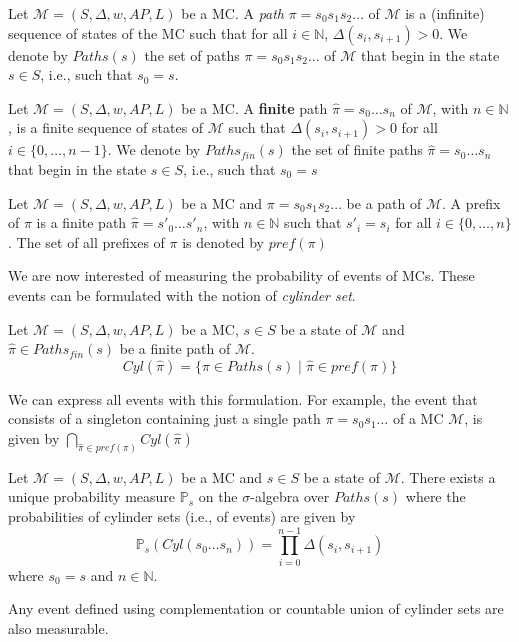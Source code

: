 \begin{definition} Let $\mathcal{M} = (S, \Delta, w, AP, L)$ be a MC.
A \textit{path} $\pi = s_0 s_1 s_2 \dots$ of $\mathcal{M}$ is a (infinite) sequence of states of the MC such that for all $i \in \mathbb{N}$, $\Delta(s_i, s_{i+1})> 0$. We denote by $Paths(s)$ the set of paths $\pi = s_0s_1s_2\dots$ of $\mathcal{M}$ that begin in the state $s \in S$, i.e., such that $s_0 = s$.
\end{definition}
\begin{definition}
Let $\mathcal{M} = (S, \Delta, w, AP, L)$ be a MC.
A \textbf{finite} path $\hat{\pi} = s_0 \dots s_n$ of $\mathcal{M}$, with $n \in \mathbb{N}$, is a finite sequence of states of $\mathcal{M}$ such that $\Delta(s_i, s_{i+1}) > 0$ for all $i \in \{0, \dots, n-1\}$.
We denote by $Paths_{fin}(s)$ the set of finite paths $\hat{\pi} = s_0 \dots s_n$ that begin in the state $s \in S$, i.e., such that $s_0 = s$
\end{definition}
\begin{definition}
Let $\mathcal{M} = (S, \Delta, w, AP, L)$ be a MC and $\pi = s_0s_1s_2 \dots$ be a path of $\mathcal{M}$. A prefix of $\pi$ is a finite path $\hat{\pi} = s'_0 \dots s'_n$, with $n \in \mathbb{N}$ such that $s'_i = s_i$ for all $i \in \{0, \dots, n\}$. The set of all prefixes of $\pi$ is denoted by $pref(\pi)$
\end{definition}

We are now interested of measuring the probability of events of MCs. These events can be formulated with the notion of \textit{cylinder set}.

\begin{definition}
Let $\mathcal{M} = (S, \Delta, w, AP, L)$ be a MC, $s \in S$ be a state of $\mathcal{M}$ and $\hat{\pi} \in Paths_{fin}(s)$ be a finite path of $\mathcal{M}$.
\[Cyl(\hat{\pi})=\{\pi\in Paths(s)\;|\;\hat{\pi}\in pref(\pi) \} \]
\end{definition}

We can express all events with this formulation. For example, the event that consists of a singleton containing just a single path $\pi = s_0s_1\dots$ of a MC $\mathcal{M}$, is given by $\bigcap_{\hat{\pi} \in pref(\pi)} Cyl(\hat{\pi})$

\begin{theorem}\label{theo1}
  Let $\mathcal{M}=(S, \Delta, w, AP, L)$ be a MC and $s \in S$ be a state of $\mathcal{M}$. There exists a unique probability measure $\mathbb{P}_s$ on the
  $\sigma$-algebra over $Paths(s)$ where the probabilities of cylinder sets (i.e., of events) are given by
  \[
    \mathbb{P}_s(Cyl(s_0 \dots s_n)) = \prod_{i = 0}^{n - 1} \Delta(s_i, s_{i+1})
  \]
  where $s_0 = s$ and $n \in \mathbb{N}$.
\end{theorem}
\begin{corollary}
Any event defined using complementation or countable union of cylinder sets are also measurable.
\end{corollary}

